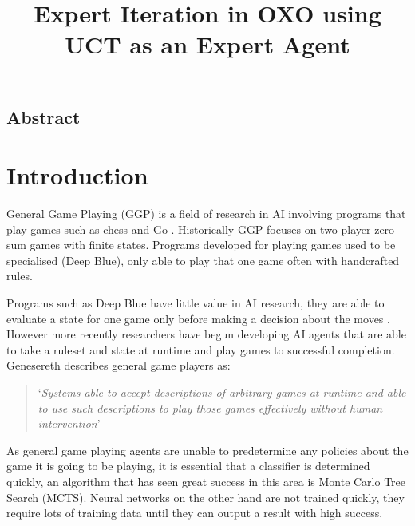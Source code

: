 \documentclass[conference]{IEEEtran}
\begin{document}
\date{}

\title{\Large\bf Expert Iteration in OXO using UCT as an Expert Agent}

\author{
}
 
\maketitle
\thispagestyle{empty}

\subsection*{\centering Abstract}
{\em

}

\section{Introduction}
General Game Playing (GGP) is a field of research in AI involving programs that play games such as chess and Go \cite{ggp2005l}. Historically GGP focuses on two-player zero sum games with finite states. Programs developed for playing games used to be specialised (Deep Blue), only able to play that one game often with handcrafted rules.

Programs such as Deep Blue have little value in AI research, they are able to evaluate a state for one game only before making a decision about the moves \cite{ggp2005l}. However more recently researchers have begun developing AI agents that are able to take a ruleset and state at runtime and play games to successful completion. Genesereth describes general game players as: 

\begin{quotation}
	\noindent`\emph{Systems able to accept descriptions of arbitrary games at runtime and able to use such descriptions to play those games effectively without human intervention}'\cite{ggp2005l} 
\end{quotation}

As general game playing agents are unable to predetermine any policies about the game it is going to be playing, it is essential that a classifier is determined quickly, an algorithm that has seen great success in this area is Monte Carlo Tree Search (MCTS).
Neural networks on the other hand are not trained quickly, they require lots of training data until they can output a result with high success.
\end{document}
